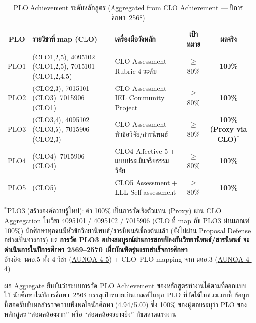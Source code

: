 \begin{table}[H]
  \centering
  \caption{PLO Achievement ระดับหลักสูตร (Aggregated from CLO Achievement — ปีการศึกษา~2568)}
  \label{tbl:plo_achievement_2568}
  \begingroup
  \footnotesize
  \setlength{\tabcolsep}{3pt}
  \renewcommand{\arraystretch}{1.2}
  \begin{tabularx}{\linewidth}{|c|>{\raggedright\arraybackslash}X|>{\raggedright\arraybackslash}X|c|c|}
    \hline
    \textbf{PLO} & \textbf{รายวิชาที่ map (CLO)} & \textbf{เครื่องมือวัดหลัก} & \textbf{เป้าหมาย} & \textbf{ผลจริง} \\
    \hline
    PLO1 & 4095101 (CLO1,2,5), 4095102 (CLO1,2,5), 7015101 (CLO1,2,4,5) & CLO Assessment + Rubric 4 ระดับ & $\geq$80\% & \textbf{100\%} \\
    \hline
    PLO2 & 4095102 (CLO2,3), 7015101 (CLO3), 7015906 (CLO1) & CLO Assessment + IEL Community Project & $\geq$80\% & \textbf{100\%} \\
    \hline
    PLO3 & 4095101 (CLO3,4), 4095102 (CLO3,5), 7015906 (CLO2,3) & CLO Assessment + หัวข้อวิจัย/สารนิพนธ์ & $\geq$80\% & \textbf{100\% (Proxy via CLO)}$^{*}$ \\
    \hline
    PLO4 & 4095102 (CLO4), 7015906 (CLO4) & CLO4 Affective 5 + แบบประเมินจริยธรรมวิจัย & $\geq$80\% & \textbf{100\%} \\
    \hline
    PLO5 & 7015906 (CLO5) & CLO5 Assessment + LLL Self-assessment & $\geq$80\% & \textbf{100\%} \\
    \hline
  \end{tabularx}
  \endgroup
  \begin{flushleft}
    \footnotesize $^{*}$PLO3 (สร้างองค์ความรู้ใหม่): ค่า 100\% เป็นการวัดเชิงตัวแทน (Proxy) ผ่าน CLO Aggregation ในวิชา 4095101 / 4095102 / 7015906 (CLO ที่ map กับ PLO3 ผ่านเกณฑ์ 100\%) นักศึกษาทุกคนมีหัวข้อวิทยานิพนธ์/สารนิพนธ์เบื้องต้นแล้ว (ยังไม่ผ่าน Proposal Defense อย่างเป็นทางการ) แต่ \textbf{การวัด PLO3 อย่างสมบูรณ์ผ่านการสอบป้องกันวิทยานิพนธ์/สารนิพนธ์ จะดำเนินการในปีการศึกษา 2569--2570 เมื่อบัณฑิตรุ่นแรกสำเร็จการศึกษา} \\
    อ้างอิง: มคอ.5 ทั้ง 4 วิชา (\hyperlink{ref:AUNQA-4-5}{AUNQA-4-5}) + CLO--PLO mapping จาก มคอ.3 (\hyperlink{ref:AUNQA-4-4}{AUNQA-4-4})
  \end{flushleft}
\end{table}

ผล Aggregate ยืนยันว่าระบบการวัด PLO Achievement ของหลักสูตรทำงานได้ตามที่ออกแบบไว้ นักศึกษาในปีการศึกษา~2568 บรรลุเป้าหมายเกินเกณฑ์ในทุก PLO ที่วัดได้ในช่วงเวลานี้ ข้อมูลนี้สอดรับกับผลสำรวจความพึงพอใจนักศึกษา (4.94/5.00) ซึ่ง 100\% ของผู้ตอบระบุว่า PLO ของหลักสูตร ``สอดคล้องมาก'' หรือ ``สอดคล้องอย่างยิ่ง'' กับตลาดแรงงาน

